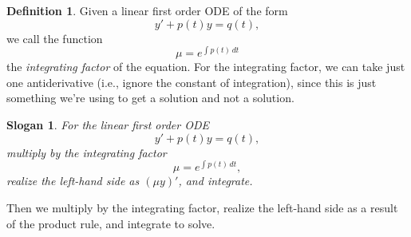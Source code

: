 \documentclass[12pt]{amsart}
\numberwithin{equation}{section}
\theoremstyle{plain} %
\newtheorem{slogan}[equation]{Slogan}
\theoremstyle{definition}
\newtheorem{defn}[equation]{Definition}
\theoremstyle{remark}
\begin{document}
\begin{defn} Given a linear first order ODE of the form
\[ y' + p(t) y = q(t),\]
we call the function
\[ \mu = e^{\int p(t) \, dt}\]
the \emph{integrating factor} of the equation. For the integrating factor, we can take just one antiderivative (i.e., ignore the constant of integration), since this is just something we're using to get a solution and not a solution.
\end{defn}

\begin{slogan}
For the linear first order ODE
\[ y' + p(t) y = q(t),\]
multiply by the integrating factor
\[ \mu = e^{\int p(t) \, dt},\]
realize the left-hand side as $(\mu y)'$,
and integrate.
\end{slogan}



Then we multiply by the integrating factor, realize the left-hand side as a result of the product rule, and integrate to solve.
\end{document}
